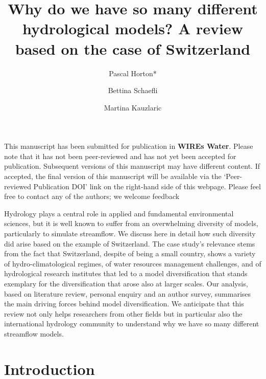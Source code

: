 \documentclass[10pt,a4paper]{article}
\renewenvironment{abstract}
 {{\bfseries\noindent{\abstractname}\par\nobreak}\footnotesize}
 {\bigskip}
\begin{document}
\title{Why do we have so many different hydrological models? A review based on the case of Switzerland}


\author[1]{Pascal Horton*}
\author[1]{Bettina Schaefli}
\author[1]{Martina Kauzlaric}


\date{}


\ifdefined\preprint
\setcounter{page}{0}
\hrulefill

This manuscript has been submitted for publication in \textbf{WIREs Water}. Please note that it has not been peer-reviewed and has not yet been accepted for publication. Subsequent versions of this manuscript may have different content. If accepted, the final version of this manuscript will be available via the ‘Peer-reviewed Publication DOI' link on the right-hand side of this webpage. Please feel free to contact any of the authors; we welcome feedback

\hrulefill
\newpage
\fi

\begingroup
\maketitle
\endgroup




\begin{abstract}
Hydrology plays a central role in applied and fundamental environmental sciences, but it is well known to suffer from an overwhelming diversity of models, particularly to simulate streamflow. We discuss here in detail how such diversity did arise based on the example of Switzerland. The case study's relevance stems from the fact that Switzerland, despite of being a small country, shows a variety of hydro-climatological regimes, of water resources management challenges, and of hydrological research institutes that led to a model diversification that stands exemplary for the diversification that arose also at larger scales. Our analysis, based on literature review, personal enquiry and an author survey, summarises the main driving forces behind model diversification. We anticipate that this review not only helps researchers from other fields but in particular also the international hydrology community to understand why we have so many different streamflow models.
\end{abstract}


\section{Introduction}
\label{sec:intro}
\end{document}
